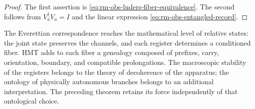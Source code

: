\begin{proof}
The first assertion is
\cref{eq:rm-obs-luders-fiber-equivalence}. The second follows from
\(V_a^\dagger V_a=I\) and the linear expression
\cref{eq:rm-obs-entangled-record}.
\end{proof}

The Everettian correspondence reaches the mathematical level of relative
states: the joint state preserves the channels, and each register determines
a conditioned fiber. HMT adds to each fiber a genealogy composed
of prefixes, carry, orientation, boundary, and compatible prolongations.
The macroscopic stability of the registers belongs to the theory of
decoherence of the apparatus; the ontology of physically autonomous branches
belongs to an additional interpretation. The preceding theorem retains its
force independently of that ontological choice.

